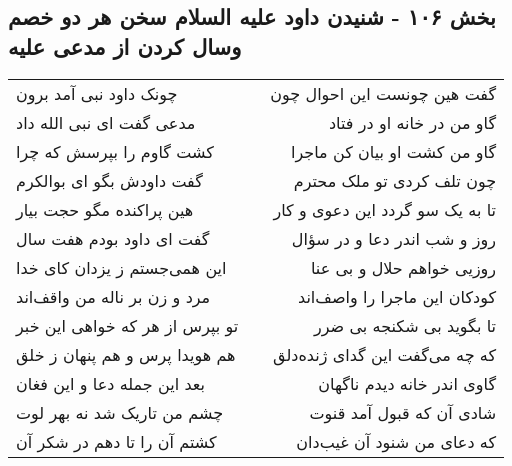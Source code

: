 \begin{center}
\section*{بخش ۱۰۶ - شنیدن داود علیه السلام سخن هر دو خصم وسال کردن از مدعی علیه}
\label{sec:sh106}
\begin{longtable}{l p{0.5cm} r}
چونک داود نبی آمد برون
&&
گفت هین چونست این احوال چون
\\
مدعی گفت ای نبی الله داد
&&
گاو من در خانه او در فتاد
\\
کشت گاوم را بپرسش که چرا
&&
گاو من کشت او بیان کن ماجرا
\\
گفت داودش بگو ای بوالکرم
&&
چون تلف کردی تو ملک محترم
\\
هین پراکنده مگو حجت بیار
&&
تا به یک سو گردد این دعوی و کار
\\
گفت ای داود بودم هفت سال
&&
روز و شب اندر دعا و در سؤال
\\
این همی‌جستم ز یزدان کای خدا
&&
روزیی خواهم حلال و بی عنا
\\
مرد و زن بر ناله من واقف‌اند
&&
کودکان این ماجرا را واصف‌اند
\\
تو بپرس از هر که خواهی این خبر
&&
تا بگوید بی شکنجه بی ضرر
\\
هم هویدا پرس و هم پنهان ز خلق
&&
که چه می‌گفت این گدای ژنده‌دلق
\\
بعد این جمله دعا و این فغان
&&
گاوی اندر خانه دیدم ناگهان
\\
چشم من تاریک شد نه بهر لوت
&&
شادی آن که قبول آمد قنوت
\\
کشتم آن را تا دهم در شکر آن
&&
که دعای من شنود آن غیب‌دان
\\
\end{longtable}
\end{center}
